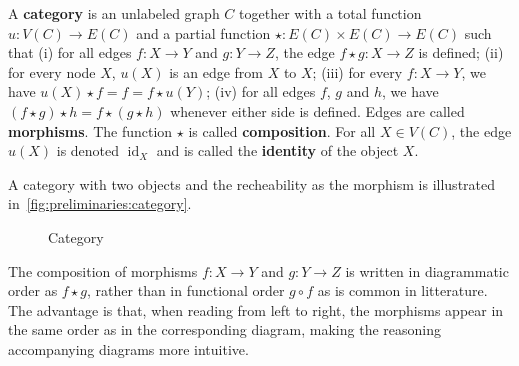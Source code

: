 \begin{definition}
    \label{def:cat}
    A \textbf{category} is an unlabeled graph \( C \) together with a total function \( u : V(C) \to E(C) \) and a partial function \( \star: E(C) \times E(C) \to E(C) \) such that 
        (i) for all edges \( f:X \to Y \) and \( g:Y \to Z \), the edge \( f \star g :X \to Z \) is defined; 
        (ii) for every node \( X \), \( u(X) \) is an edge from \( X \) to \( X \);
        (iii) for every \( f:X \to Y \), we have \(u(X) \star f = f = f \star u(Y)\);
        (iv) for all edges \( f \), \( g \) and \(h\), we have \( (f \star g) \star h = f \star (g \star h) \) whenever either side is defined.
    Edges are called \textbf{morphisms}. The function $\star$ is called \textbf{composition}. For all \( X \in V(C) \), the edge \( u(X) \) is denoted \( \operatorname{id}_X \) and is called the \textbf{identity} of the object \( X \).
\end{definition} 

\begin{example}
    A category with two objects and the recheability as the morphism is illustrated in~\autoref{fig:preliminaries:category}.
    \begin{figure}[!ht]
        \centering
        \caption{Category}
        \label{fig:preliminaries:category}
    \end{figure}
\end{example}

\begin{notation}
    The composition of morphisms \( f : X \to Y \) and \( g : Y \to Z \) is written in diagrammatic order as \( f \star g \), rather than in functional order \( g \circ f \) as is common in litterature. The advantage is that, when reading from left to right, the morphisms appear in the same order as in the corresponding diagram, making the reasoning accompanying diagrams more intuitive. 
\end{notation}  

